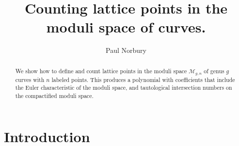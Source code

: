 \documentclass{amsart}
\newcommand{\modm}{\mathcal{M}}
\begin{document}
\title{Counting lattice points in the moduli space of curves.}
\author{Paul Norbury}
\address{Department of Mathematics and Statistics\\
University of Melbourne\\Australia 3010\\
and Boston University\\
111 Cummington St\\
Boston MA 02215}
\keywords{}
\date{}




\begin{abstract}

\noindent We show how to define and count lattice points in the moduli space $\modm_{g,n}$ of genus $g$ curves with $n$ labeled points.  This produces a polynomial with coefficients that include the Euler characteristic of the moduli space, and tautological intersection numbers on the compactified moduli space.

\end{abstract}

\maketitle

\section{Introduction}
\end{document}
